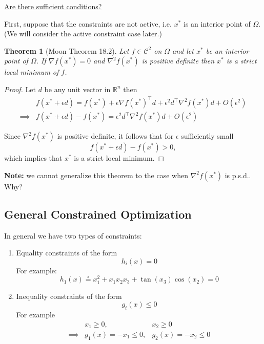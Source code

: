 \documentclass{article}
\newtheorem{theorem}{Theorem}[section]
\newcommand{\defeq}{\circeq}
\begin{document}
	\underline{Are there sufficient conditions?}
	
	
	First, suppose that the constraints are not active, i.e. $x^{\ast}$ is an interior point of $\Omega$.  (We will consider the active constraint case later.)
	
	
	\begin{theorem}[Moon Theorem 18.2]
		Let $f \in \mathcal{C}^2$ on $\Omega$ and let $x^{\ast}$ be an interior point of $\Omega$.  If $\nabla f(x^{\ast}) = 0$ and $\nabla^2f(x^{\ast})$ is positive definite then $x^{\ast}$ is a strict local minimum of $f$.
	\end{theorem}
	\begin{proof}
		Let $d$ be any unit vector in $\mathbb{R}^n$ then 
		\begin{align*}
			& 	f(x^{\ast} + \epsilon d) = f(x^{\ast}) + \epsilon\nabla f(x^{\ast})^\top d + \epsilon^2d^\top \nabla^2f(x^{\ast})d + O(\epsilon^2) \\
			\implies & 
			f(x^{\ast} + \epsilon d)  - f(x^{\ast}) = \epsilon^2d^\top \nabla^2f(x^{\ast})d + O(\epsilon^2)
		\end{align*}
	
		Since $\nabla^2f(x^{\ast})$ is positive definite, it follows that for $\epsilon$ sufficiently small
		\[ 
			f(x^{\ast}+\epsilon d) - f(x^{\ast}) > 0,
		\]
		which implies that $x^{\ast}$ is a strict local minimum. 	
	\end{proof}
	
	
	{\bf Note:} we cannot generalize this theorem to the case when $\nabla^2f(x^{\ast})$ is p.s.d..  Why?

\subsection{General Constrained Optimization}

	In general we have two types of constraints:
	\begin{enumerate}
		\item 	
			Equality constraints of the form
			\[ 
				h_i(x) = 0 
			\]
			For example:
			\[
				h_1(x) \defeq x_1^2 + x_1x_2x_3 + \tan(x_3)\cos(x_2) = 0
			\]
			
		\item 
			Inequality constraints of the form
			\[ 
				g_i(x) \leq 0 
			\]
			For example
			\begin{align*}
				& x_1 \geq 0, & x_2 \geq 0 \\
				\implies & g_1(x) = -x_1 \leq 0, & g_2(x) = -x_2 \leq 0 
			\end{align*}
			\end{enumerate}
\end{document}
